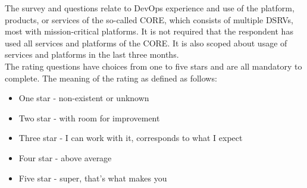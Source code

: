 \documentclass[a4paper,12pt]{article}
\begin{document}
    The survey and questions relate to DevOps experience and use of the platform, products, or services of the so-called CORE,
    which consists of multiple DSRVs, most with mission-critical platforms.
    It is not required that the respondent has used all services and platforms of the CORE.
    It is also scoped about usage of services and platforms in the last three months.\\
    The rating questions have choices from one to five stars and are all mandatory to complete.
    The meaning of the rating as defined as follows:
    \begin{itemize}
        \item One star - non-existent or unknown
        \item Two star - with room for improvement
        \item Three star - I can work with it, corresponds to what I expect
        \item Four star - above average
        \item Five star - super, that's what makes you
    \end{itemize}
\end{document}
